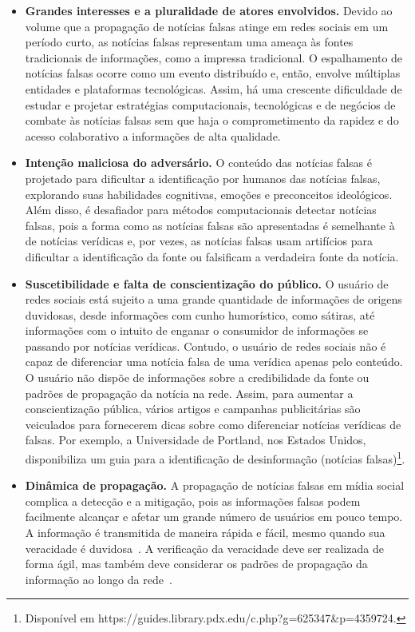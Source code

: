 \documentclass{SBCbookchapter}
\begin{document}
\begin{itemize}

\item {\bf Grandes interesses e a pluralidade de atores envolvidos.} Devido ao volume que a propagação de notícias falsas atinge em redes sociais em um período curto, as notícias falsas representam uma ameaça às fontes tradicionais de informações, como a impressa tradicional. O espalhamento de notícias falsas ocorre como um evento distribuído e, então, envolve múltiplas entidades e plataformas tecnológicas. Assim, há uma crescente dificuldade de estudar e projetar estratégias computacionais, tecnológicas e de negócios de combate às notícias falsas sem que haja o comprometimento da rapidez e do acesso colaborativo a informações de alta qualidade.

\item {\bf Intenção maliciosa do adversário.} O conteúdo das notícias falsas é projetado para dificultar a identificação por humanos das notícias falsas, explorando suas habilidades cognitivas, emoções e preconceitos ideológicos. Além disso, é desafiador para métodos computacionais detectar notícias falsas, pois a forma como as notícias falsas são apresentadas é semelhante à de notícias verídicas e, por vezes, as notícias falsas usam artifícios para dificultar a identificação da fonte ou falsificam a verdadeira fonte da notícia.

\item {\bf Suscetibilidade e falta de conscientização do público.} O usuário de redes sociais está sujeito a uma grande quantidade de informações de origens duvidosas, desde informações com cunho humorístico, como sátiras, até informações com o intuito de enganar o consumidor de informações se passando por notícias verídicas. Contudo, o usuário de redes sociais não é capaz de diferenciar uma notícia falsa de uma verídica apenas pelo conteúdo. O usuário não dispõe de informações sobre a credibilidade da fonte ou padrões de propagação da notícia na rede. Assim, para aumentar a conscientização pública, vários artigos e campanhas publicitárias são veiculados para fornecerem dicas sobre como diferenciar notícias verídicas de falsas. Por exemplo, a Universidade de Portland, nos Estados Unidos, disponibiliza um guia para a identificação de desinformação (notícias falsas)\footnote{Disponível em https://guides.library.pdx.edu/c.php?g=625347\&p=4359724.}. 

\item {\bf Dinâmica de propagação.} A propagação de notícias falsas em mídia social complica a detecção e a mitigação, pois as informações falsas podem facilmente alcançar e afetar um grande número de usuários em pouco tempo. A informação é transmitida de maneira rápida e fácil, mesmo quando sua veracidade é duvidosa~\cite{friggeri2014}. A verificação da veracidade deve ser realizada de forma ágil, mas também deve considerar os padrões de propagação da informação ao longo da rede~\cite{meel2020}.


\end{itemize}
\end{document}
